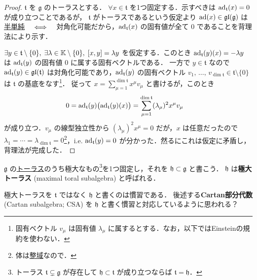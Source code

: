 \documentclass[rep_main]{subfiles}
\begin{document}
\begin{proof}
	$\mathfrak{t}$ を $\mathfrak{g}$ のトーラスとする．
	$\forall x \in \mathfrak{t}$ を1つ固定する．示すべきは $\operatorname{ad}_{\mathfrak{t}} (x) = 0$ が成り立つことであるが，
	$\mathfrak{t}$ がトーラスであるという仮定より $\operatorname{ad} (x) \in \mathfrak{gl} (\mathfrak{g})$ は\hyperref[def:semisimple-end]{半単純} $\quad \Longleftrightarrow \quad$ 対角化可能だから，$\operatorname{ad}_{\mathfrak{t}}(x)$ の固有値が全て $0$ であることを背理法により示す．

	$\exists y \in \mathfrak{t} \setminus \{0\},\; \exists \lambda \in \mathbb{K} \setminus \{0\},\; \comm{x}{y} = \lambda y$ を仮定する．このとき $\operatorname{ad}_{\mathfrak{t}}(y)(x) = -\lambda y$ は $\operatorname{ad}_{\mathfrak{t}}(y)$ の固有値 $0$ に属する固有ベクトルである．
	一方で $y \in \mathfrak{t}$ なので $\operatorname{ad}_{\mathfrak{t}}(y) \in \mathfrak{gl}(\mathfrak{t})$ は対角化可能であり，$\operatorname{ad}_{\mathfrak{t}}(y)$ の固有ベクトル $v_1,\, \dots,\, v_{\dim \mathfrak{t}} \in \mathfrak{t} \setminus \{0\}$ は $\mathfrak{t}$ の基底をなす\footnote{固有ベクトル $v_\mu$ は固有値 $\lambda_\mu$ に属するとする．なお，以下ではEinsteinの規約を使わない．}． 
	従って $x = \sum_{\mu=1}^{\dim \mathfrak{t}} x^\mu v_\mu$ と書けるが，このとき
	\begin{align}
		0 = \operatorname{ad}_{\mathfrak{t}} (y) \bigl(\operatorname{ad}_{\mathfrak{t}}(y)(x)\bigr) &= \sum_{\mu=1}^{\dim \mathfrak{t}} (\lambda_\mu)^2 x^\mu v_\mu 
	\end{align}
	が成り立つ．$v_\mu$ の線型独立性から $(\lambda_\mu)^2 x^\mu = 0$ だが，$x$ は任意だったので $\lambda_1 = \cdots = \lambda_{\dim \mathfrak{t}} = 0$\footnote{体は\hyperref[def:domain-basic]{整域}なので．}，i.e. $\operatorname{ad}_{\mathfrak{t}}(y) = 0$ が分かった．然るにこれは仮定に矛盾し，背理法が完成した．
\end{proof}

	

$\mathfrak{g}$ の\hyperref[def:toral-subLieAlg]{トーラス}のうち極大なもの\footnote{トーラス $\mathfrak{t} \subsetneq \mathfrak{g}$ が存在して $\mathfrak{h} \subset \mathfrak{t}$ が成り立つならば $\mathfrak{t} = \mathfrak{h}$．}を1つ固定し，それを $\mathfrak{h} \subset \mathfrak{g}$ と書こう．
$\mathfrak{h}$ は\textbf{極大トーラス} (maximal toral subalgebra) と呼ばれる．
\begin{marker}
	極大トーラスを $\mathfrak{t}$ ではなく $\mathfrak{h}$ と書くのは慣習である．
	後述する\textbf{Cartan部分代数} (Cartan subalgebra; CSA) を $\mathfrak{h}$ と書く慣習と対応しているように思われる？
\end{marker}
\end{document}
